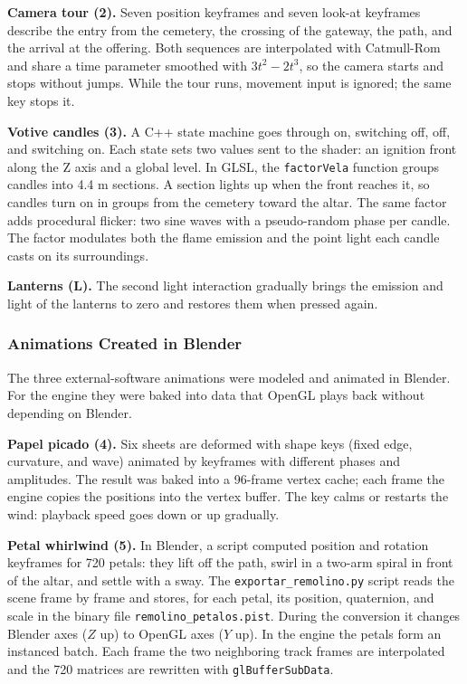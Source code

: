 \documentclass[letter,12pt]{article}
\begin{document}
	\textbf{Camera tour (2).} Seven position keyframes and seven look-at keyframes describe the entry from the cemetery, the crossing of the gateway, the path, and the arrival at the offering. Both sequences are interpolated with Catmull-Rom and share a time parameter smoothed with $3t^2 - 2t^3$, so the camera starts and stops without jumps. While the tour runs, movement input is ignored; the same key stops it.

	\textbf{Votive candles (3).} A C++ state machine goes through on, switching off, off, and switching on. Each state sets two values sent to the shader: an ignition front along the Z axis and a global level. In GLSL, the \texttt{factorVela} function groups candles into 4.4 m sections. A section lights up when the front reaches it, so candles turn on in groups from the cemetery toward the altar. The same factor adds procedural flicker: two sine waves with a pseudo-random phase per candle. The factor modulates both the flame emission and the point light each candle casts on its surroundings.

	\textbf{Lanterns (L).} The second light interaction gradually brings the emission and light of the lanterns to zero and restores them when pressed again.

	\subsubsection{Animations Created in Blender}
	The three external-software animations were modeled and animated in Blender. For the engine they were baked into data that OpenGL plays back without depending on Blender.

	\textbf{Papel picado (4).} Six sheets are deformed with shape keys (fixed edge, curvature, and wave) animated by keyframes with different phases and amplitudes. The result was baked into a 96-frame vertex cache; each frame the engine copies the positions into the vertex buffer. The key calms or restarts the wind: playback speed goes down or up gradually.

	\textbf{Petal whirlwind (5).} In Blender, a script computed position and rotation keyframes for 720 petals: they lift off the path, swirl in a two-arm spiral in front of the altar, and settle with a sway. The \texttt{exportar\_remolino.py} script reads the scene frame by frame and stores, for each petal, its position, quaternion, and scale in the binary file \texttt{remolino\_petalos.pist}. During the conversion it changes Blender axes ($Z$ up) to OpenGL axes ($Y$ up). In the engine the petals form an instanced batch. Each frame the two neighboring track frames are interpolated and the 720 matrices are rewritten with \texttt{glBufferSubData}.
\end{document}
